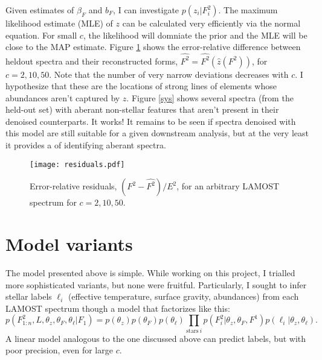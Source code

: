 \documentclass[12pt]{article}
\begin{document}
Given estimates of $\beta_F$ and $b_F$, I can investigate $p(z_i | F^2_i)$.
The maximum likelihood estimate (MLE) of $z$ can be calculated very efficiently via the normal equation.
For small $c$, the likelihood will domniate the prior and the MLE will be close to the MAP estimate.
Figure \ref{residuals} shows the error-relative difference between heldout spectra and their reconstructed forms, $\widehat{F^2}  = \widehat{F^2}(\hat{z}(F^2))$, for $c=2, 10, 50$.
Note that the number of very narrow deviations decreases with $c$.
I hypothesize that these are the locations of strong lines of elements whose abundances aren't captured by $z$.
Figure \ref{sys} shows several spectra (from the held-out set) with aberant non-stellar features that aren't present in their denoised counterparts. It works!  
It remains to be seen if spectra denoised with this model are still suitable for a given downstream analysis, but at the very least it provides a of identifying aberant spectra.

\begin{figure}
    \centering
    \texttt{[image: residuals.pdf]}
    \caption{Error-relative residuals, $(F^2 - \widehat{F^2})/E^2$, for an arbitrary LAMOST spectrum for $c=2, 10, 50$.}
    \label{residuals}
\end{figure} 


\section{Model variants} \label{var}
The model presented above is simple.
While working on this project, I trialled more sophisticated variants, but none were fruitful.
Particularly, I sought to infer stellar labels $\ell_i$ (effective temperature, surface gravity, abundances) from each LAMOST spectrum though a model that factorizes like this:
\begin{equation}
    p(F^2_{1:n}, L, \theta_z, \theta_F, \theta_\ell| F_1) = p(\theta_z) p(\theta_F) p(\theta_\ell) \prod_{\mathrm{stars}~i}  p(F^2_i | \theta_z, \theta_F, F^1) p(\ell_i | \theta_z, \theta_\ell) .
\end{equation}
A linear model analogous to the one discussed above can predict labels, but with poor precision, even for large $c$.
\end{document}
